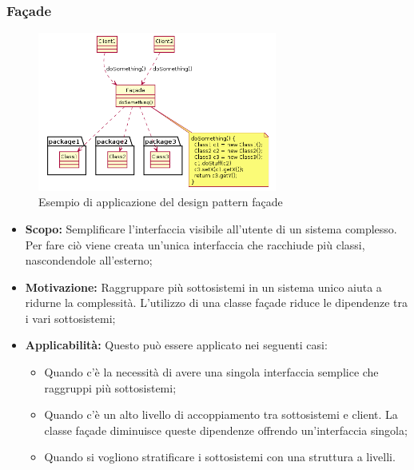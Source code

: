 \documentclass{scalatekids-article}
\begin{document}
\subsubsection{Façade}

\begin{figure}[H]
  \begin{center}
    \includegraphics[width=0.7\textwidth, keepaspectratio]{img/designPattern/Facade.png}
    \caption{Esempio di applicazione del design pattern façade}
  \end{center}
\end{figure}

\begin{itemize}

\item \textbf{Scopo:} Semplificare l'interfaccia visibile all'utente di un sistema complesso.
  Per fare ciò viene creata un'unica interfaccia che racchiude più classi, nascondendole all'esterno;

\item \textbf{Motivazione:} Raggruppare più sottosistemi in un sistema unico aiuta a ridurne la complessità.
  L'utilizzo di una classe façade riduce le dipendenze tra i vari sottosistemi;

\item \textbf{Applicabilità:} Questo  può essere
  applicato nei seguenti casi:
  \begin{itemize}
  \item Quando c'è la necessità di avere una singola interfaccia semplice che raggruppi più sottosistemi;
  \item Quando c'è un alto livello di accoppiamento tra sottosistemi e client. La
    classe façade diminuisce queste dipendenze offrendo un'interfaccia singola;
  \item Quando si vogliono stratificare i sottosistemi con una struttura a livelli.
  \end{itemize}

\end{itemize}
\end{document}
